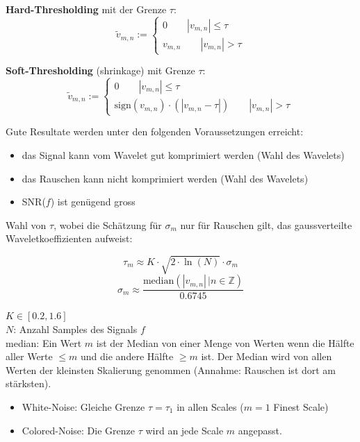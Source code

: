 \begin{minipage}[c]{0.5\textwidth}
	\textbf{Hard-Thresholding} mit der Grenze $\tau$:
	\[ \tilde{v}_{m,n} := \begin{cases} 0 \qquad |v_{m,n}| \leq \tau \\ v_{m,n} \qquad |v_{m,n}| > \tau \end{cases} \]
\end{minipage}
\begin{minipage}[c]{0.5\textwidth}
	\textbf{Soft-Thresholding} (shrinkage) mit Grenze $\tau$:
	\[ \tilde{v}_{m,n} := \begin{cases} 0 \qquad |v_{m,n}| \leq \tau \\ \mathrm{sign}(v_{m,n}) \cdot (|v_{m,n}-\tau|) \qquad |v_{m,n}| > \tau \end{cases} \]
\end{minipage}

Gute Resultate werden unter den folgenden Voraussetzungen erreicht:
\begin{itemize}
	\item das Signal kann vom Wavelet gut komprimiert werden (Wahl des Wavelets)
	\item das Rauschen kann nicht komprimiert werden (Wahl des Wavelets)
	\item SNR($f$) ist genügend gross
\end{itemize}


Wahl von $\tau$, wobei die Schätzung für $\sigma_m$ nur für Rauschen gilt, das gaussverteilte Waveletkoeffizienten aufweist:

\begin{minipage}[c]{0.5\textwidth}
\[
	\tau_m \approx K \cdot \sqrt{2 \cdot \ln(N)} \cdot \sigma_m  
\]
\[
	\sigma_m \approx \dfrac{\mathrm{median}(|v_{m,n}| \, | n \in  \mathbb{Z})}{0.6745} 
\]
\end{minipage}
\begin{minipage}[c]{0.5\textwidth}
$K \in [0.2,1.6]$\\
$N$: Anzahl Samples des Signals $f$\\
median: Ein Wert $m$ ist der Median von einer Menge von Werten wenn die Hälfte aller Werte $\leq m$ und die andere Hälfte $\geq m$ ist. Der Median wird von allen Werten der kleinsten Skalierung genommen (Annahme: Rauschen ist dort am stärksten).
\end{minipage}

\begin{itemize}
	\item White-Noise: Gleiche Grenze $\tau = \tau_1$ in allen Scales ($m=1$ Finest Scale)
	\item Colored-Noise: Die Grenze $\tau$ wird an jede Scale $m$ angepasst.
\end{itemize}



